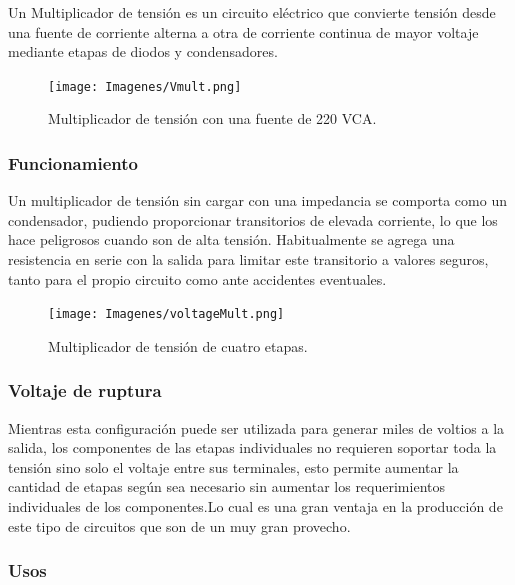 \documentclass{article}
\begin{document}
Un Multiplicador de tensión es un circuito eléctrico que convierte tensión desde una fuente de corriente alterna a otra de corriente continua de mayor voltaje mediante etapas de diodos y condensadores.\citep{multTensWiki}\\

\begin{figure}[ht!]
    \centering
    \texttt{[image: Imagenes/Vmult.png]}
    \caption{Multiplicador de tensión con una fuente de 220 VCA.}
    \label{fig:vmult}
\end{figure}

\subsubsection{Funcionamiento}

Un multiplicador de tensión sin cargar con una impedancia se comporta como un condensador, pudiendo proporcionar transitorios de elevada corriente, lo que los hace peligrosos cuando son de alta tensión. Habitualmente se agrega una resistencia en serie con la salida para limitar este transitorio a valores seguros, tanto para el propio circuito como ante accidentes eventuales.\citep{multTensWiki}\\

\begin{figure}[ht!]
    \centering
    \texttt{[image: Imagenes/voltageMult.png]}
    \caption{Multiplicador de tensión de cuatro etapas.}
    \label{fig:vmult2}
\end{figure}

\subsubsection{Voltaje de ruptura}

Mientras esta configuración puede ser utilizada para generar miles de voltios a la salida, los componentes de las etapas individuales no requieren soportar toda la tensión sino solo el voltaje entre sus terminales, esto permite aumentar la cantidad de etapas según sea necesario sin aumentar los requerimientos individuales de los componentes.Lo cual es una gran ventaja en la producción de este tipo de circuitos que son de un muy gran provecho.\citep{multTensWiki}\\

\subsubsection{Usos}
\end{document}
